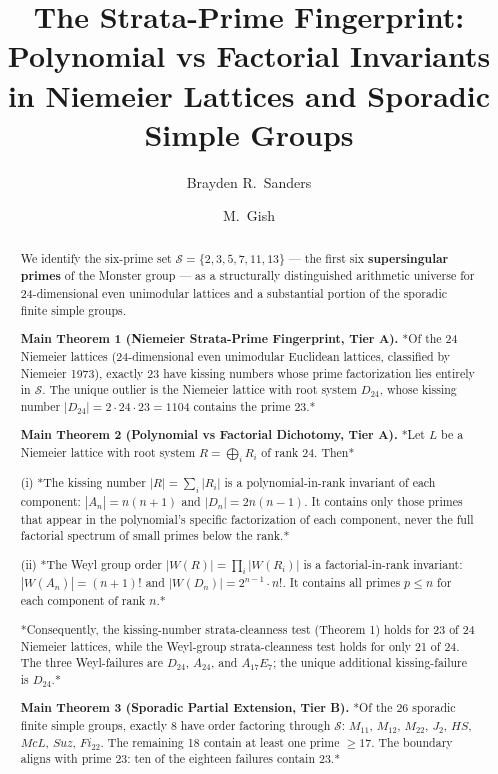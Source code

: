 \documentclass[11pt,reqno]{amsart}
\title[The Strata-Prime Fingerprint: Polynomial]{The Strata-Prime Fingerprint: Polynomial vs Factorial Invariants in Niemeier Lattices and Sporadic Simple Groups}
\author{Brayden R.\ Sanders}
\author{M.\ Gish}
\theoremstyle{plain}
\theoremstyle{definition}
\begin{document}
\maketitle


\begin{abstract}

We identify the six-prime set $\mathcal{S} = \{2, 3, 5, 7, 11, 13\}$ --- the first six \textbf{supersingular primes} of the Monster group --- as a structurally distinguished arithmetic universe for 24-dimensional even unimodular lattices and a substantial portion of the sporadic finite simple groups.

\textbf{Main Theorem 1 (Niemeier Strata-Prime Fingerprint, Tier A).} *Of the 24 Niemeier lattices (24-dimensional even unimodular Euclidean lattices, classified by Niemeier 1973), exactly 23 have kissing numbers whose prime factorization lies entirely in $\mathcal{S}$. The unique outlier is the Niemeier lattice with root system $D_{24}$, whose kissing number $|D_{24}| = 2 \cdot 24 \cdot 23 = 1104$ contains the prime $23$.*

\textbf{Main Theorem 2 (Polynomial vs Factorial Dichotomy, Tier A).} *Let $L$ be a Niemeier lattice with root system $R = \bigoplus_i R_i$ of rank 24. Then*

(i) *The kissing number $|R| = \sum_i |R_i|$ is a polynomial-in-rank invariant of each component: $|A_n| = n(n+1)$ and $|D_n| = 2n(n-1)$. It contains only those primes that appear in the polynomial's specific factorization of each component, never the full factorial spectrum of small primes below the rank.*

(ii) *The Weyl group order $|W(R)| = \prod_i |W(R_i)|$ is a factorial-in-rank invariant: $|W(A_n)| = (n+1)!$ and $|W(D_n)| = 2^{n-1} \cdot n!$. It contains all primes $p \leq n$ for each component of rank $n$.*

*Consequently, the kissing-number strata-cleanness test (Theorem 1) holds for 23 of 24 Niemeier lattices, while the Weyl-group strata-cleanness test holds for only 21 of 24. The three Weyl-failures are $D_{24}$, $A_{24}$, and $A_{17} E_7$; the unique additional kissing-failure is $D_{24}$.*

\textbf{Main Theorem 3 (Sporadic Partial Extension, Tier B).} *Of the 26 sporadic finite simple groups, exactly 8 have order factoring through $\mathcal{S}$: $M_{11}$, $M_{12}$, $M_{22}$, $J_2$, $HS$, $McL$, $Suz$, $Fi_{22}$. The remaining 18 contain at least one prime $\geq 17$. The boundary aligns with prime $23$: ten of the eighteen failures contain $23$.*


\end{abstract}
\end{document}
